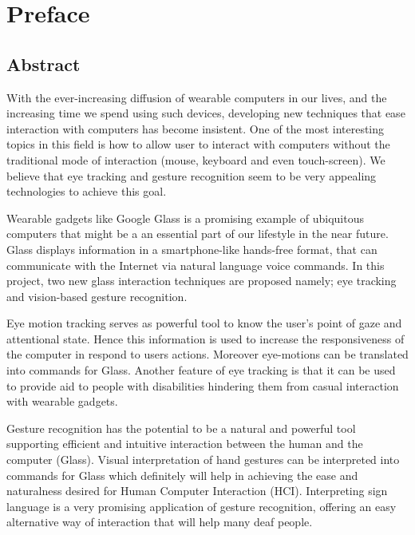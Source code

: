 \documentclass[12pt,fleqn]{book} %
\begin{document}
\tableofcontents %

\cleardoublepage %

\pagestyle{fancy} %




\chapter*{Preface}
\section*{Abstract}
With the ever-increasing diffusion of wearable computers in our lives, and the increasing time we spend using such devices, developing new techniques that ease interaction with computers has become insistent. One of the most interesting topics in this field is how to allow user to interact with computers without the traditional mode of interaction (mouse, keyboard and even touch-screen). We believe that eye tracking and gesture recognition seem to be very appealing technologies to achieve this goal.\bigskip

Wearable gadgets like Google Glass is a promising example of ubiquitous computers that might be a an essential part of our lifestyle in the near future. Glass displays information in a smartphone-like hands-free format, that can communicate with the Internet via natural language voice commands. In this project, two new glass interaction techniques are proposed namely; eye tracking and vision-based gesture recognition.\bigskip

Eye motion tracking serves as powerful tool to know the user's point of gaze and attentional state. Hence this information is used to increase the responsiveness of the computer in respond to users actions. Moreover eye-motions can be translated into commands for Glass. Another feature of eye tracking is that it can be used to provide aid to people with disabilities hindering them from casual interaction with wearable gadgets.\bigskip

Gesture recognition has the potential to be a natural and powerful tool supporting efficient and intuitive interaction between the human and the computer (Glass). Visual interpretation of hand gestures can be interpreted into commands for Glass which definitely will help in achieving the ease and naturalness desired for Human Computer Interaction (HCI). Interpreting sign language is a very promising application of gesture recognition, offering an easy alternative way of interaction that will help many deaf people.
\end{document}
